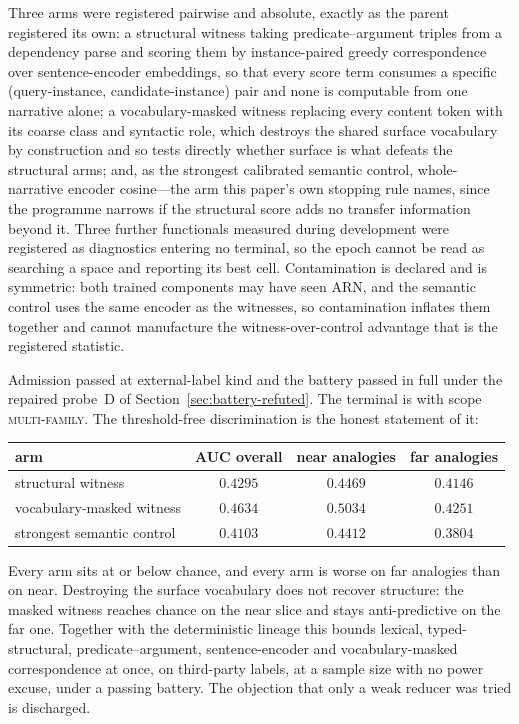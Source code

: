 Three arms were registered pairwise and absolute, exactly as the parent registered its own: a structural witness taking predicate--argument triples from a dependency parse and scoring them by instance-paired greedy correspondence over sentence-encoder embeddings, so that every score term consumes a specific (query-instance, candidate-instance) pair and none is computable from one narrative alone; a vocabulary-masked witness replacing every content token with its coarse class and syntactic role, which destroys the shared surface vocabulary by construction and so tests directly whether surface is what defeats the structural arms; and, as the strongest calibrated semantic control, whole-narrative encoder cosine---the arm this paper's own stopping rule names, since the programme narrows if the structural score adds no transfer information beyond it. Three further functionals measured during development were registered as diagnostics entering no terminal, so the epoch cannot be read as searching a space and reporting its best cell. Contamination is declared and is symmetric: both trained components may have seen ARN, and the semantic control uses the same encoder as the witnesses, so contamination inflates them together and cannot manufacture the witness-over-control advantage that is the registered statistic.

Admission passed at external-label kind and the battery passed in full under the repaired probe~D of Section~\ref{sec:battery-refuted}. The terminal is  with scope \textsc{multi-family}. The threshold-free discrimination is the honest statement of it:

\begin{center}
\begin{tabular}{lccc}
\toprule
arm & AUC overall & near analogies & far analogies \\
\midrule
structural witness & $0.4295$ & $0.4469$ & $0.4146$ \\
vocabulary-masked witness & $0.4634$ & $0.5034$ & $0.4251$ \\
strongest semantic control & $0.4103$ & $0.4412$ & $0.3804$ \\
\bottomrule
\end{tabular}
\end{center}

Every arm sits at or below chance, and every arm is worse on far analogies than on near. Destroying the surface vocabulary does not recover structure: the masked witness reaches chance on the near slice and stays anti-predictive on the far one. Together with the deterministic lineage this bounds lexical, typed-structural, predicate--argument, sentence-encoder and vocabulary-masked correspondence at once, on third-party labels, at a sample size with no power excuse, under a passing battery. The objection that only a weak reducer was tried is discharged.

